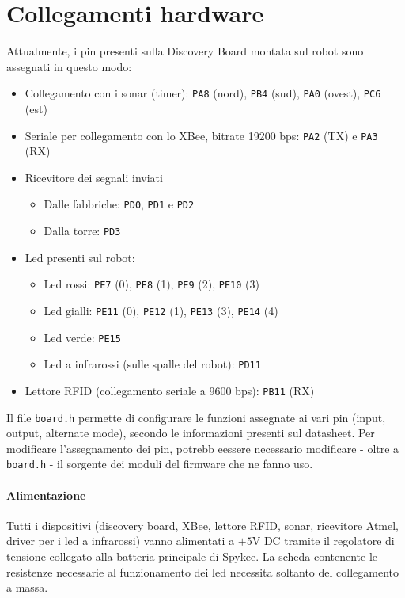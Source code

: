\section{Collegamenti hardware}
Attualmente, i pin presenti sulla Discovery Board montata sul robot sono assegnati in questo modo:
\begin{itemize}
\item Collegamento con i sonar (timer): \verb|PA8| (nord), \verb|PB4| (sud), \verb|PA0| (ovest), \verb|PC6| (est)
\item Seriale per collegamento con lo XBee, bitrate 19200 bps: \verb|PA2| (TX) e \verb|PA3| (RX)
\item Ricevitore dei segnali inviati
	\begin{itemize}
	\item Dalle fabbriche: \verb|PD0|, \verb|PD1| e \verb|PD2|
	\item Dalla torre: \verb|PD3|
	\end{itemize}
\item Led presenti sul robot:
	\begin{itemize}
	\item Led rossi: \verb|PE7| (0), \verb|PE8| (1), \verb|PE9| (2), \verb|PE10| (3)
	\item Led gialli: \verb|PE11| (0), \verb|PE12| (1), \verb|PE13| (3), \verb|PE14| (4)
	\item Led verde: \verb|PE15|
	\item Led a infrarossi (sulle spalle del robot): \verb|PD11|
	\end{itemize}
\item Lettore RFID (collegamento seriale a 9600 bps): \verb|PB11| (RX)
\end{itemize}
\begin{nota}
Il file \verb|board.h| permette di configurare le funzioni assegnate ai vari pin (input, output, alternate mode), secondo le informazioni presenti sul datasheet. Per modificare l'assegnamento dei pin, potrebb eessere necessario modificare - oltre a \verb|board.h| - il sorgente dei moduli del firmware che ne fanno uso.
\end{nota}

\paragraph{Alimentazione} Tutti i dispositivi (discovery board, XBee, lettore RFID, sonar, ricevitore Atmel, driver per i led a infrarossi) vanno alimentati a $+5$V DC tramite il regolatore di tensione collegato alla batteria principale di Spykee. La scheda contenente le resistenze necessarie al funzionamento dei led necessita soltanto del collegamento a massa.

